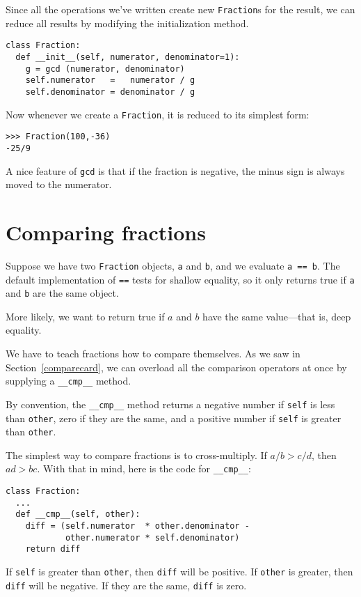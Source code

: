 Since all the operations we've written
create new {\tt Fraction}s for the result, we can reduce all results
by modifying the initialization method.

\beforeverb
\begin{verbatim}
class Fraction:
  def __init__(self, numerator, denominator=1):
    g = gcd (numerator, denominator)
    self.numerator   =   numerator / g
    self.denominator = denominator / g
\end{verbatim}
\afterverb
%
Now whenever we create a {\tt Fraction}, it is reduced to its simplest
form:

\beforeverb
\begin{verbatim}
>>> Fraction(100,-36)
-25/9
\end{verbatim}
\afterverb
%
A nice feature of {\tt gcd} is that if the fraction is
negative, the minus sign is always moved to the numerator.


\section{Comparing fractions}

Suppose we have two {\tt Fraction} objects, {\tt a} and {\tt b}, and we
evaluate {\tt a == b}.  The default implementation of {\tt ==}
tests for shallow equality, so it only returns true if {\tt a}
and {\tt b} are the same object.

More likely, we want to return true if $a$ and $b$ have
the same value---that is, deep equality.

We have to teach fractions how to compare themselves.  As we saw in
Section~\ref{comparecard}, we can overload all the comparison
operators at once by supplying a {\tt \_\_cmp\_\_} method.

By convention, the {\tt \_\_cmp\_\_} method returns a
negative number if {\tt self} is less than {\tt other}, zero
if they are the same, and a positive number if {\tt self} is greater
than {\tt other}.

The simplest way to compare fractions is to cross-multiply.
If $a/b > c/d$, then $ad > bc$.
With that in mind, here is the code for {\tt \_\_cmp\_\_}:

\beforeverb
\begin{verbatim}
class Fraction:
  ...
  def __cmp__(self, other):
    diff = (self.numerator  * other.denominator -
            other.numerator * self.denominator)
    return diff
\end{verbatim}
\afterverb
%
If {\tt self} is greater than {\tt other}, then {\tt diff}
will be positive.  If {\tt other} is greater, then {\tt diff}
will be negative.  If they are the same, {\tt diff} is zero.


